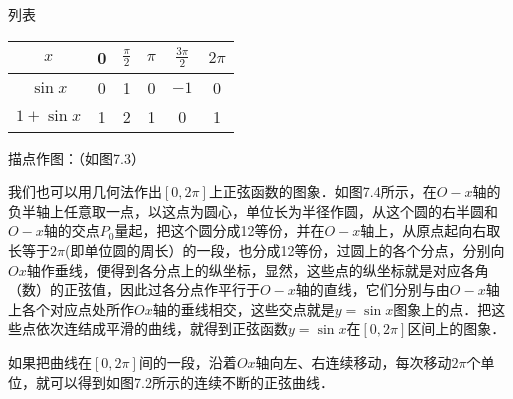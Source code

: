 \begin{solution}
    列表    
\begin{center}
\begin{tabular}{c|ccccc}
    \hline
    $x$ & 0  & $\frac{\pi}{2}$  & $\pi$  & $\frac{3\pi}{2}$  & $2\pi$  \\
    \hline
    $\sin x$   &  0 & 1  & 0  & $-1$  &0\\
    $1+\sin x$   & 1  & 2  & 1  & 0  & 1\\
    \hline
\end{tabular}    
\end{center}

描点作图：（如图7.3）
\begin{figure}[htp]
    \centering
{}
    \caption{}
\end{figure}

\end{solution}

我们也可以用几何法作出$[0, 2\pi]$上正弦函数的图象．如图7.4所示，在$O-x$轴的负半轴上任意取一点，以这点为圆心，单位长为半径作圆，从这个圆的右半圆和$O-x$轴的交点$P_0$量起，把这个圆分成12等份，并在$O-x$轴上，从原点起向右取长等于$2\pi$(即单位圆的周长）的一段，也分成12等份，过圆上的各个分点，分别向$Ox$轴作垂线，便得到各分点上的纵坐标，显然，这些点的纵坐标就是对应各角（数）的正弦值，因此过各分点作平行于$O-x$轴的直线，它们分别与由$O-x$轴上各个对应点处所作$Ox$轴的垂线相交，这些交点就是$y=\sin x$图象上的点．把这些点依次连结成平滑的曲线，就得到正弦函数$y=\sin x$在$[0, 2\pi]$区间上的图象．

如果把曲线在$[0, 2\pi]$间的一段，沿着$Ox$轴向左、右连续移动，每次移动$2\pi$个单位，就可以得到如图7.2所示的连续不断的正弦曲线．

